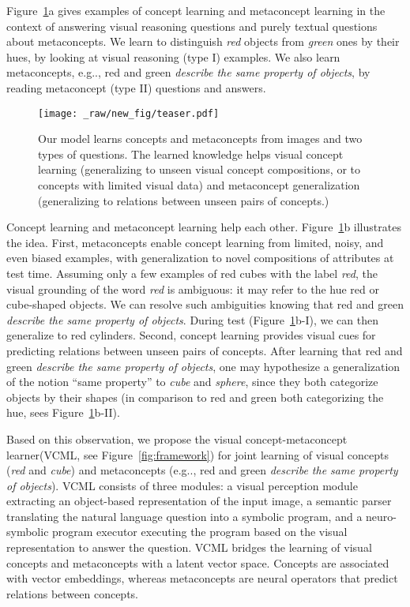 \documentclass{article}
\makeatletter
\newcommand{\fig}[1]{Figure~\ref{#1}}
\DeclareRobustCommand\onedot{\futurelet\@let@token\@onedot}
\def\@onedot{\ifx\@let@token.\else.\null\fi\xspace}
\def\eg{e.g\onedot} \def\Eg{E.g\onedot}
\newcommand{\modelfull}{visual concept-metaconcept learner\xspace}
\newcommand{\model}{VCML\xspace}
\makeatother
\begin{document}
\fig{fig:teaser}a gives examples of concept learning and metaconcept learning in the context of answering visual reasoning questions and purely textual questions about metaconcepts. We learn to distinguish {\it red} objects from {\it green} ones by their hues, by looking at visual reasoning (type I) examples. We also learn metaconcepts, \eg, red and green {\it describe the same property of objects}, by reading metaconcept (type II) questions and answers.

\begin{figure}[t]
    \centering
    \texttt{[image: \_raw/new\_fig/teaser.pdf]}
    \vspace{-1.5em}
    \caption{Our model learns concepts and metaconcepts from images and two types of questions. The learned knowledge 
helps visual concept learning
    (generalizing to unseen visual concept compositions, or to concepts with limited visual data) and metaconcept generalization (generalizing to relations between unseen pairs of concepts.) 
}
    \vspace{-1em}
    \label{fig:teaser}
\end{figure} 
Concept learning and metaconcept learning help each other. \fig{fig:teaser}b illustrates the idea. First, metaconcepts enable concept learning from limited, noisy, and even biased examples, with generalization to novel compositions of attributes at test time. Assuming only a few examples of red cubes with the label {\it red}, the visual grounding of the word {\it red} is ambiguous: it may refer to the hue red or cube-shaped objects. We can resolve such ambiguities knowing that red and green {\it describe the same property of objects}. During test (\fig{fig:teaser}b-I), we can then generalize to red cylinders. Second, concept learning provides visual cues for predicting relations between unseen pairs of concepts. After learning that red and green {\it describe the same property of objects}, one may hypothesize a generalization of the notion ``same property'' to {\it cube} and {\it sphere}, since they both categorize objects by their shapes (in comparison to red and green both categorizing the hue, sees \fig{fig:teaser}b-II).



Based on this observation, we propose the \modelfull (\model, see \fig{fig:framework}) for joint learning of visual concepts ({\it red} and {\it cube}) and metaconcepts (\eg, red and green {\it describe the same property of objects}). \model consists of three modules: a visual perception module extracting an object-based representation of the input image, a semantic parser translating the natural language question into a symbolic program, and a neuro-symbolic program executor executing the program based on the visual representation to answer the question. \model bridges the learning of visual concepts and metaconcepts with a latent vector space. Concepts are associated with vector embeddings, whereas metaconcepts are neural operators that predict relations between concepts. 
\end{document}

